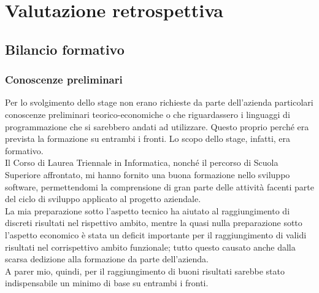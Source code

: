 
\chapter{Valutazione retrospettiva}

\section{Bilancio formativo}


\subsection{Conoscenze preliminari}

Per lo svolgimento dello stage non erano richieste da parte dell'azienda particolari conoscenze preliminari teorico-economiche o che riguardassero i linguaggi di programmazione che si sarebbero andati ad utilizzare. Questo proprio perché era prevista la formazione su entrambi i fronti. Lo scopo dello stage, infatti, era formativo.\\

Il Corso di Laurea Triennale in Informatica, nonché il percorso di Scuola Superiore affrontato, mi hanno fornito una buona formazione nello sviluppo software, permettendomi la comprensione di gran parte delle attività facenti parte del ciclo di sviluppo applicato al progetto aziendale.\\

La mia preparazione sotto l'aspetto tecnico ha aiutato al raggiungimento di discreti risultati nel rispettivo ambito, mentre la quasi nulla preparazione sotto l'aspetto economico è stata un deficit importante per il raggiungimento di validi risultati nel corrispettivo ambito funzionale; tutto questo causato anche dalla scarsa dedizione alla formazione da parte dell'azienda.\\

A parer mio, quindi, per il raggiungimento di buoni risultati sarebbe stato indispensabile un minimo di base su entrambi i fronti.

